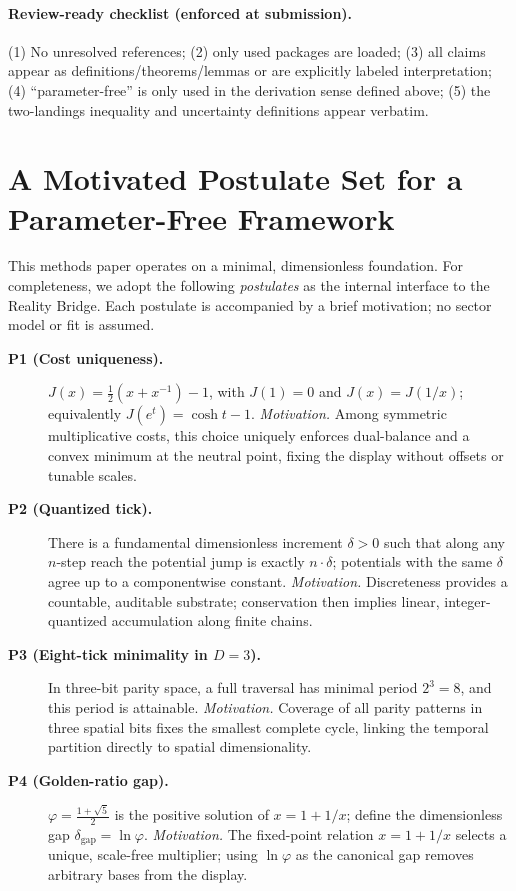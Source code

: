 \documentclass[11pt]{article}
\theoremstyle{plain}
\theoremstyle{definition}
\theoremstyle{remark}
\begin{document}
\paragraph{Review-ready checklist (enforced at submission).}
(1) No unresolved references; (2) only used packages are loaded; (3) all claims appear as definitions/theorems/lemmas or are explicitly labeled interpretation; (4) “parameter-free” is only used in the derivation sense defined above; (5) the two-landings inequality and uncertainty definitions appear verbatim.

\section{A Motivated Postulate Set for a Parameter-Free Framework}
\noindent
This methods paper operates on a minimal, dimensionless foundation. For completeness, we adopt the following \emph{postulates} as the internal interface to the Reality Bridge. Each postulate is accompanied by a brief motivation; no sector model or fit is assumed.

\begin{description}
  \item[\textbf{P1 (Cost uniqueness).}] \(J(x)=\tfrac12(x+x^{-1})-1\), with \(J(1)=0\) and \(J(x)=J(1/x)\); equivalently \(J(e^{t})=\cosh t-1\).
  \emph{Motivation.} Among symmetric multiplicative costs, this choice uniquely enforces dual-balance and a convex minimum at the neutral point, fixing the display without offsets or tunable scales.

  \item[\textbf{P2 (Quantized tick).}] There is a fundamental dimensionless increment \(\delta>0\) such that along any \(n\)-step reach the potential jump is exactly \(n\cdot\delta\); potentials with the same \(\delta\) agree up to a componentwise constant.
  \emph{Motivation.} Discreteness provides a countable, auditable substrate; conservation then implies linear, integer-quantized accumulation along finite chains.

  \item[\textbf{P3 (Eight-tick minimality in \(D=3\)).}] In three-bit parity space, a full traversal has minimal period \(2^{3}=8\), and this period is attainable.
  \emph{Motivation.} Coverage of all parity patterns in three spatial bits fixes the smallest complete cycle, linking the temporal partition directly to spatial dimensionality.

  \item[\textbf{P4 (Golden-ratio gap).}] \(\varphi=\tfrac{1+\sqrt5}{2}\) is the positive solution of \(x=1+1/x\); define the dimensionless gap \(\delta_{\mathrm{gap}}=\ln\varphi\).
  \emph{Motivation.} The fixed-point relation \(x=1+1/x\) selects a unique, scale-free multiplier; using \(\ln\varphi\) as the canonical gap removes arbitrary bases from the display.
\end{description}
\end{document}

